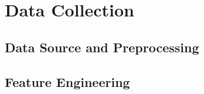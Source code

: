\section{Data Collection}

\subsection{Data Source and Preprocessing}

\subsection{Feature Engineering}
